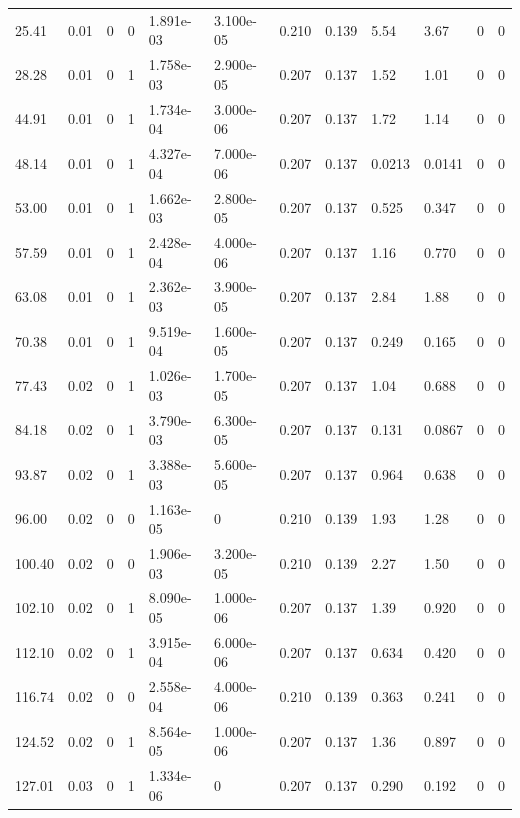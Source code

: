 \documentclass[preview]{standalone}
\begin{document}
{{\begin{tabular}{L{1.2cm}C{1.2cm} C{0.3cm}C{0.5cm} C{1.4cm}C{1.4cm} C{1.4cm}C{1.4cm} C{1.6cm}C{1.6cm} C{1.6cm}C{1.6cm}}
  25.41  &  0.01  & 0     &  0 &  1.891e-03  & 3.100e-05  &  0.210&   0.139& 5.54 & 3.67   &  0 & 0  \\ 
  28.28  &  0.01  & 0     &  1 &  1.758e-03  & 2.900e-05  &  0.207&   0.137& 1.52 & 1.01   &  0 & 0  \\ 
  44.91  &  0.01  & 0     &  1 &  1.734e-04  & 3.000e-06  &  0.207&   0.137& 1.72 & 1.14   &  0 & 0  \\ 
  48.14  &  0.01  & 0     &  1 &  4.327e-04  & 7.000e-06  &  0.207&   0.137& 0.0213 & 0.0141   &  0 & 0  \\ 
  53.00  &  0.01  & 0     &  1 &  1.662e-03  & 2.800e-05  &  0.207&   0.137& 0.525 & 0.347   &  0 & 0  \\ 
  57.59  &  0.01  & 0     &  1 &  2.428e-04  & 4.000e-06  &  0.207&   0.137& 1.16 & 0.770   &  0 & 0  \\ 
  63.08  &  0.01  & 0     &  1 &  2.362e-03  & 3.900e-05  &  0.207&   0.137& 2.84 & 1.88   &  0 & 0  \\ 
  70.38  &  0.01  & 0     &  1 &  9.519e-04  & 1.600e-05  &  0.207&   0.137& 0.249 & 0.165   &  0 & 0  \\ 
  77.43  &  0.02  & 0     &  1 &  1.026e-03  & 1.700e-05  &  0.207&   0.137& 1.04 & 0.688   &  0 & 0  \\ 
  84.18  &  0.02  & 0     &  1 &  3.790e-03  & 6.300e-05  &  0.207&   0.137& 0.131 & 0.0867   &  0 & 0  \\ 
  93.87  &  0.02  & 0     &  1 &  3.388e-03  & 5.600e-05  &  0.207&   0.137& 0.964 & 0.638   &  0 & 0  \\ 
  96.00  &  0.02  & 0     &  0 &  1.163e-05  & 0  &  0.210&   0.139& 1.93 & 1.28   &  0 & 0  \\ 
  100.40  &  0.02  & 0     &  0 &  1.906e-03  & 3.200e-05  &  0.210&   0.139& 2.27 & 1.50   &  0 & 0  \\ 
  102.10  &  0.02  & 0     &  1 &  8.090e-05  & 1.000e-06  &  0.207&   0.137& 1.39 & 0.920   &  0 & 0  \\ 
  112.10  &  0.02  & 0     &  1 &  3.915e-04  & 6.000e-06  &  0.207&   0.137& 0.634 & 0.420   &  0 & 0  \\ 
  116.74  &  0.02  & 0     &  0 &  2.558e-04  & 4.000e-06  &  0.210&   0.139& 0.363 & 0.241   &  0 & 0  \\ 
  124.52  &  0.02  & 0     &  1 &  8.564e-05  & 1.000e-06  &  0.207&   0.137& 1.36 & 0.897   &  0 & 0  \\ 
  127.01  &  0.03  & 0     &  1 &  1.334e-06  & 0  &  0.207&   0.137& 0.290 & 0.192   &  0 & 0  \\ 

\end{tabular}}}
\end{document}
